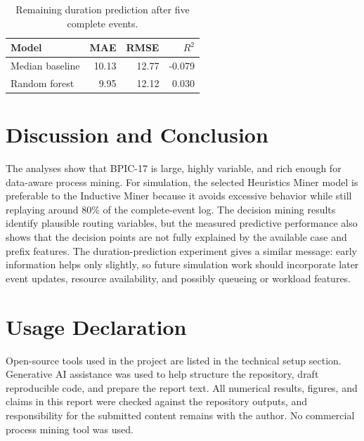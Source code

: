 \documentclass[
  english,
  font=times,
  twocolumn,
]{tumarticle}
\begin{document}
\begin{table}[t]
    \caption{Remaining duration prediction after five complete events.}
    \centering
    \small
    \begin{tabular}{lrrr}
        \toprule
        \textbf{Model} & \textbf{MAE} & \textbf{RMSE} & \textbf{$R^2$} \\
        \midrule
        Median baseline & 10.13 & 12.77 & -0.079 \\
        Random forest & 9.95 & 12.12 & 0.030 \\
        \bottomrule
    \end{tabular}
    \label{tab:advancedmetrics}
\end{table}

\section{Discussion and Conclusion}

The analyses show that BPIC-17 is large, highly variable, and rich enough for data-aware process mining.
For simulation, the selected Heuristics Miner model is preferable to the Inductive Miner because it avoids excessive behavior while still replaying around 80\% of the complete-event log.
The decision mining results identify plausible routing variables, but the measured predictive performance also shows that the decision points are not fully explained by the available case and prefix features.
The duration-prediction experiment gives a similar message: early information helps only slightly, so future simulation work should incorporate later event updates, resource availability, and possibly queueing or workload features.

\section{Usage Declaration}

Open-source tools used in the project are listed in the technical setup section.
Generative AI assistance was used to help structure the repository, draft reproducible code, and prepare the report text.
All numerical results, figures, and claims in this report were checked against the repository outputs, and responsibility for the submitted content remains with the author.
No commercial process mining tool was used.

\FloatBarrier



\clearpage
\appendix
\end{document}

